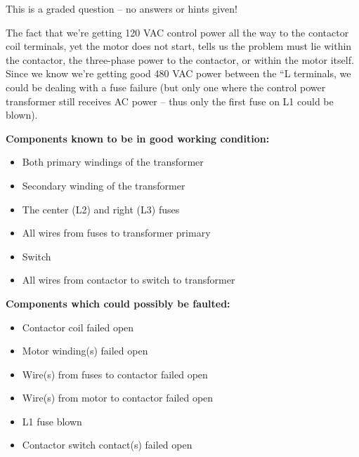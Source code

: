 \vfil 

\eject






This is a graded question -- no answers or hints given!







The fact that we're getting 120 VAC control power all the way to the contactor coil terminals, yet the motor does not start, tells us the problem must lie within the contactor, the three-phase power to the contactor, or within the motor itself.  Since we know we're getting good 480 VAC power between the ``L  terminals, we could be dealing with a fuse failure (but only one where the control power transformer still receives AC power -- thus only the first fuse on L1 could be blown).

\vskip 10pt

\noindent
{\bf Components known to be in good working condition:}

\begin{itemize}
\item{} Both primary windings of the transformer
\item{} Secondary winding of the transformer
\item{} The center (L2) and right (L3) fuses
\item{} All wires from fuses to transformer primary
\item{} Switch
\item{} All wires from contactor to switch to transformer
\end{itemize}

\vskip 10pt

\goodbreak
\noindent
{\bf Components which could possibly be faulted:}

\begin{itemize}
\item{} Contactor coil failed open
\item{} Motor winding(s) failed open
\item{} Wire(s) from fuses to contactor failed open
\item{} Wire(s) from motor to contactor failed open
\item{} L1 fuse blown
\item{} Contactor switch contact(s) failed open
\end{itemize}




